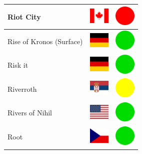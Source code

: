 \documentclass[12pt, a4paper, twoside]{report}
\begin{document}
\begin{center}
\begin{longtable}{|p{5cm}|p{2cm}|p{2cm}|}
 Riot City                                                  & \includegraphics[width=1cm]{../4x3/ca} &   \includegraphics[width=1cm]{../likes/n} \\ \hline
 Rise of Kronos (Surface)                                   & \includegraphics[width=1cm]{../4x3/de} &   \includegraphics[width=1cm]{../likes/y} \\ \hline
 Risk it                                                    & \includegraphics[width=1cm]{../4x3/de} &   \includegraphics[width=1cm]{../likes/y} \\ \hline
 Riverroth                                                  & \includegraphics[width=1cm]{../4x3/rs} &   \includegraphics[width=1cm]{../likes/m} \\ \hline
 Rivers of Nihil                                            & \includegraphics[width=1cm]{../4x3/us} &   \includegraphics[width=1cm]{../likes/y} \\ \hline
 Root                                                       & \includegraphics[width=1cm]{../4x3/cz} &   \includegraphics[width=1cm]{../likes/y} \\ \hline

\end{longtable}
\end{center}
\end{document}
